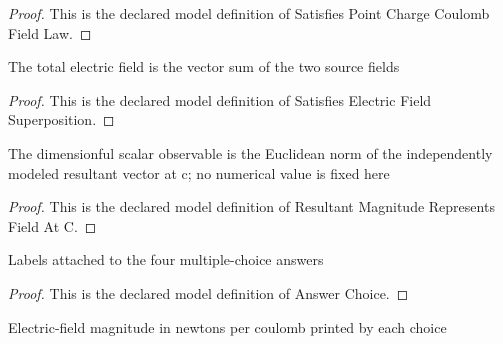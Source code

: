 \begin{proof}
  This is the declared model definition of Satisfies Point Charge Coulomb Field Law.
\end{proof}
\begin{definition}
  \label{def:physics:phyx-mini-0994:phyxminiproblems-problemphyxmini0994-satisfieselectricfieldsuperposition}
  The total electric field is the vector sum of the two source fields
\end{definition}
\begin{proof}
  This is the declared model definition of Satisfies Electric Field Superposition.
\end{proof}
\begin{definition}
  \label{def:physics:phyx-mini-0994:phyxminiproblems-problemphyxmini0994-resultantmagnituderepresentsfieldatc}
  The dimensionful scalar observable is the Euclidean norm of the independently modeled resultant vector at c; no numerical value is fixed here
\end{definition}
\begin{proof}
  This is the declared model definition of Resultant Magnitude Represents Field At C.
\end{proof}
\begin{definition}
  \label{def:physics:phyx-mini-0994:phyxminiproblems-problemphyxmini0994-answerchoice}
  Labels attached to the four multiple-choice answers
\end{definition}
\begin{proof}
  This is the declared model definition of Answer Choice.
\end{proof}
\begin{definition}
  \label{def:physics:phyx-mini-0994:phyxminiproblems-problemphyxmini0994-answerchoice-fieldmagnitudeinnewtonspercoulomb}
  Electric-field magnitude in newtons per coulomb printed by each choice
\end{definition}
